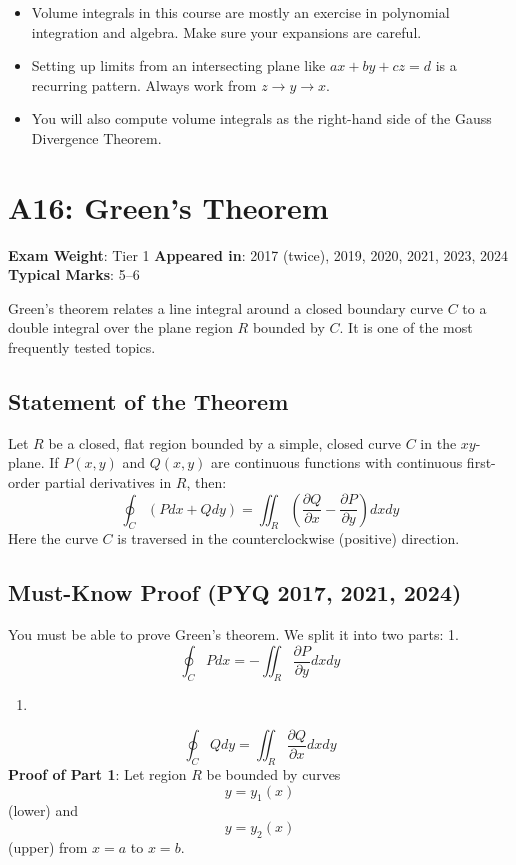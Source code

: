 \documentclass[
]{article}
\providecommand{\tightlist}{%
  \setlength{\itemsep}{0pt}\setlength{\parskip}{0pt}}
\renewenvironment{quote}
  {\begin{tcolorbox}[
     colback=calloutbg,
     colframe=calloutframe,
     colupper=callouttext,
     arc=3pt,
     boxrule=0.5pt,
     leftrule=0.5pt,
     borderline west={3pt}{0pt}{calloutaccent},
     left=8pt,
     right=8pt,
     top=6pt,
     bottom=6pt
   ]}
  {\end{tcolorbox}}
\begin{document}
\begin{itemize}
\tightlist
\item
  Volume integrals in this course are mostly an exercise in polynomial
  integration and algebra. Make sure your expansions are careful.
\item
  Setting up limits from an intersecting plane like \(ax + by + cz = d\)
  is a recurring pattern. Always work from \(z \to y \to x\).
\item
  You will also compute volume integrals as the right-hand side of the
  Gauss Divergence Theorem.
\end{itemize}

\section{A16: Green's Theorem}\label{a16-greens-theorem}

\begin{quote}
\textbf{Exam Weight}: Tier 1 \textbar{} \textbf{Appeared in}: 2017
(twice), 2019, 2020, 2021, 2023, 2024 \textbar{} \textbf{Typical Marks}:
5--6
\end{quote}

Green's theorem relates a line integral around a closed boundary curve
\(C\) to a double integral over the plane region \(R\) bounded by \(C\).
It is one of the most frequently tested topics.

\subsection{Statement of the Theorem}\label{statement-of-the-theorem}

Let \(R\) be a closed, flat region bounded by a simple, closed curve
\(C\) in the \(xy\)-plane. If \(P(x,y)\) and \(Q(x,y)\) are continuous
functions with continuous first-order partial derivatives in \(R\),
then:
\[
\oint_C (P dx + Q dy) = \iint_R \left( \frac{\partial Q}{\partial x} - \frac{\partial P}{\partial y} \right) dx dy
\]
Here the curve \(C\) is traversed in the counterclockwise (positive)
direction.

\subsection{Must-Know Proof (PYQ 2017, 2021,
2024)}\label{must-know-proof-pyq-2017-2021-2024}

You must be able to prove Green's theorem. We split it into two parts:
1.
\[
\oint_C P dx = -\iint_R \frac{\partial P}{\partial y} dx dy
\]
\begin{enumerate}
\def\labelenumi{\arabic{enumi}.}
\setcounter{enumi}{1}
\tightlist
\item
\end{enumerate}
\[
\oint_C Q dy = \iint_R \frac{\partial Q}{\partial x} dx dy
\]
\textbf{Proof of Part 1}: Let region \(R\) be bounded by curves
\[
y = y_1(x)
\]
(lower) and
\[
y = y_2(x)
\]
(upper) from \(x=a\) to \(x=b\).
\end{document}
